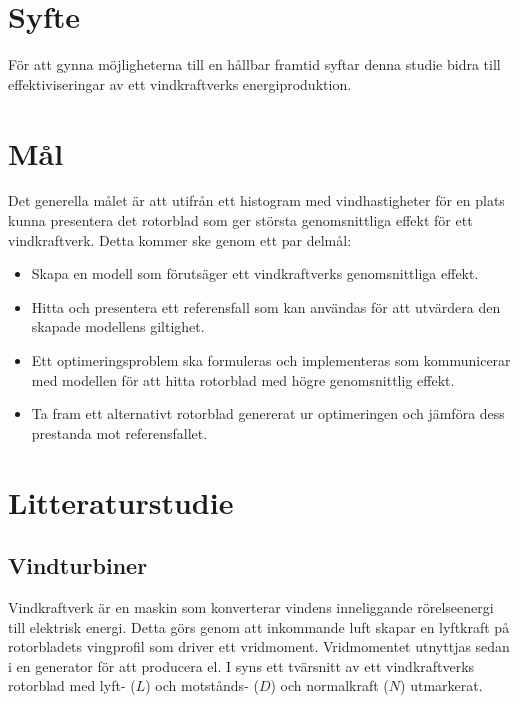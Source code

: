 \section{Syfte}
För att gynna möjligheterna till en hållbar framtid syftar denna studie bidra till effektiviseringar av ett vindkraftverks energiproduktion.

\section{Mål}
Det generella målet är att utifrån ett histogram med vindhastigheter för en plats kunna presentera det rotorblad som ger största genomsnittliga effekt för ett vindkraftverk. Detta kommer ske genom ett par delmål:

\begin{itemize}

  \item Skapa en modell som förutsäger ett vindkraftverks genomsnittliga effekt.

  \item Hitta och presentera ett referensfall som kan användas för att utvärdera den skapade modellens giltighet.
  
  \item Ett optimeringsproblem ska formuleras och implementeras som kommunicerar med modellen för att hitta rotorblad med högre genomsnittlig effekt.
  
  \item Ta fram ett alternativt rotorblad genererat ur optimeringen och jämföra dess prestanda mot referensfallet.
 
\end{itemize}




\section{Litteraturstudie}

\subsection{Vindturbiner}
Vindkraftverk är en maskin som konverterar vindens inneliggande rörelseenergi till elektrisk energi. Detta görs genom att inkommande luft skapar en lyftkraft på rotorbladets vingprofil som driver ett vridmoment. Vridmomentet utnyttjas sedan i en generator för att producera el. I  syns ett tvärsnitt av ett vindkraftverks rotorblad med lyft- ($L$) och motstånds- ($D$) och normalkraft ($N$) utmarkerat. 


